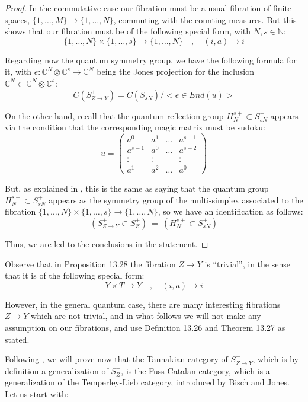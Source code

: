 \documentclass[12pt]{amsbook}
\begin{document}
\begin{proof}
In the commutative case our fibration must be a usual fibration of finite spaces, $\{1,\ldots,M\}\to\{1,\ldots,N\}$, commuting with the counting measures. But this shows that our fibration must be of the following special form, with $N,s\in\mathbb N$:
$$\{1,\ldots,N\}\times\{1,\ldots,s\}\to\{1,\ldots,N\}\quad,\quad (i,a)\to i$$

Regarding now the quantum symmetry group, we have the following formula for it, with $e:\mathbb C^N\otimes\mathbb C^s\to\mathbb C^N$ being the Jones projection for the inclusion $\mathbb C^N\subset\mathbb C^N\otimes\mathbb C^s$:
$$C(S_{Z\to Y}^+)=C(S_{sN}^+)\Big/\Big<e\in End(u)\Big>$$

On the other hand, recall that the quantum reflection group $H_N^{s+}\subset S_{sN}^+$ appears via the condition that the corresponding magic matrix must be sudoku:
$$u=\begin{pmatrix}
a^0&a^1&\ldots&a^{s-1}\\
a^{s-1}&a^0&\ldots&a^{s-2}\\
\vdots&\vdots&&\vdots\\
a^1&a^2&\ldots&a^0
\end{pmatrix}$$

But, as explained in \cite{ba2}, this is the same as saying that the quantum group $H_N^{s+}\subset S_{sN}^+$ appears as the symmetry group of the multi-simplex associated to the fibration $\{1,\ldots,N\}\times\{1,\ldots,s\}\to\{1,\ldots,N\}$, so we have an identification as follows:
$$(S_{Z\to Y}^+\subset S_Z^+)\ = \ (H_N^{s+}\subset S_{sN}^+)$$

Thus, we are led to the conclusions in the statement.
\end{proof}

Observe that in Proposition 13.28 the fibration $Z\to Y$ is ``trivial'', in the sense that it is of the following special form:
$$Y\times T\to Y\quad,\quad (i,a)\to i$$

However, in the general quantum case, there are many interesting fibrations $Z\to Y$ which are not trivial, and in what follows we will not make any assumption on our fibrations, and use Definition 13.26 and Theorem 13.27 as stated.

\bigskip

Following \cite{ba2}, we will prove now that the Tannakian category of $S_{Z\to Y}^+$, which is by definition a generalization of $S_Z^+$, is the Fuss-Catalan category, which is a generalization of the Temperley-Lieb category, introduced by Bisch and Jones. Let us start with: 
\end{document}
